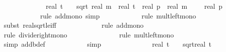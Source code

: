 \begin{isabellebody}
\ \ \ \ \ \ \ \ \isamarkupfalse%
\ \isamarkupfalse%
\ {\isachardoublequoteopen}{\isachardot}{\kern0pt}{\isachardot}{\kern0pt}{\isachardot}{\kern0pt}\ {\isasymle}\ real\ t\ {\isacharplus}{\kern0pt}\ {}\ {\isacharasterisk}{\kern0pt}\ sqrt\ {\isacharparenleft}{\kern0pt}real\ m\ {\isacharasterisk}{\kern0pt}\ {\isacharparenleft}{\kern0pt}real\ t\ {\isacharasterisk}{\kern0pt}\ real\ p\ {\isacharslash}{\kern0pt}\ {\isacharparenleft}{\kern0pt}real\ m\ {\isacharasterisk}{\kern0pt}\ {\isacharparenleft}{\kern0pt}{}{\isacharminus}{\kern0pt}\ {\isasymdelta}{\isacharprime}{\kern0pt}{\isacharparenright}{\kern0pt}{\isacharparenright}{\kern0pt}{\isacharparenright}{\kern0pt}\ {\isacharslash}{\kern0pt}\ real\ p\ {\isacharplus}{\kern0pt}\ {}{\isacharparenright}{\kern0pt}{\isachardoublequoteclose}\isanewline
\ \ \ \ \ \ \ \ \ \ \isamarkupfalse%
\ {\isacharparenleft}{\kern0pt}rule\ add{\isacharunderscore}{\kern0pt}mono{\isacharcomma}{\kern0pt}\ simp{\isacharparenright}{\kern0pt}\isanewline
\ \ \ \ \ \ \ \ \ \ \isamarkupfalse%
\ {\isacharparenleft}{\kern0pt}rule\ mult{\isacharunderscore}{\kern0pt}left{\isacharunderscore}{\kern0pt}mono{\isacharparenright}{\kern0pt}\isanewline
\ \ \ \ \ \ \ \ \ \ \ \isamarkupfalse%
\ {\isacharparenleft}{\kern0pt}subst\ real{\isacharunderscore}{\kern0pt}sqrt{\isacharunderscore}{\kern0pt}le{\isacharunderscore}{\kern0pt}iff{\isacharparenright}{\kern0pt}\isanewline
\ \ \ \ \ \ \ \ \ \ \ \isamarkupfalse%
\ {\isacharparenleft}{\kern0pt}rule\ add{\isacharunderscore}{\kern0pt}mono{\isacharparenright}{\kern0pt}\isanewline
\ \ \ \ \ \ \ \ \ \ \ \ \isamarkupfalse%
\ {\isacharparenleft}{\kern0pt}rule\ divide{\isacharunderscore}{\kern0pt}right{\isacharunderscore}{\kern0pt}mono{\isacharparenright}{\kern0pt}\isanewline
\ \ \ \ \ \ \ \ \ \ \ \ \ \isamarkupfalse%
\ {\isacharparenleft}{\kern0pt}rule\ mult{\isacharunderscore}{\kern0pt}left{\isacharunderscore}{\kern0pt}mono{\isacharparenright}{\kern0pt}\isanewline
\ \ \ \ \ \ \ \ \ \ \isamarkupfalse%
\ {\isacharparenleft}{\kern0pt}simp\ add{\isacharcolon}{\kern0pt}b{\isacharunderscore}{\kern0pt}def{\isacharparenright}{\kern0pt}\isanewline
\ \ \ \ \ \ \ \ \ \ \isamarkupfalse%
\ simp{\isacharplus}{\kern0pt}\ \isanewline
\ \ \ \ \ \ \ \ \isamarkupfalse%
\ \isamarkupfalse%
\ {\isachardoublequoteopen}{\isachardot}{\kern0pt}{\isachardot}{\kern0pt}{\isachardot}{\kern0pt}\ {\isasymle}\ real\ t\ {\isacharplus}{\kern0pt}\ {}\ {\isacharasterisk}{\kern0pt}\ sqrt{\isacharparenleft}{\kern0pt}real\ t\ {\isacharslash}{\kern0pt}\ {\isacharparenleft}{\kern0pt}{}{\isacharminus}{\kern0pt}{\isasymdelta}{\isacharprime}{\kern0pt}{\isacharparenright}{\kern0pt}\ {\isacharplus}{\kern0pt}\ {}{\isacharparenright}{\kern0pt}{\isachardoublequoteclose}\isanewline

\end{isabellebody}
